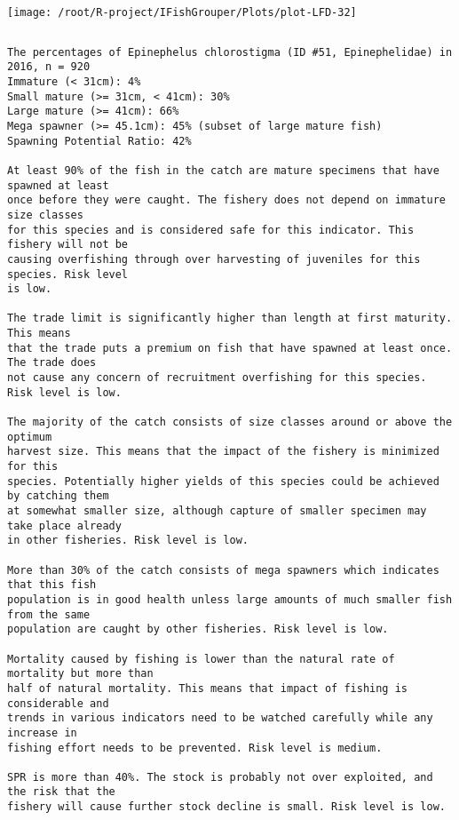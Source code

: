 \documentclass{report}\usepackage[]{graphicx}\usepackage[]{color}
\makeatletter
\def\maxwidth{ %
  \ifdim\Gin@nat@width>\linewidth
    \linewidth
  \else
    \Gin@nat@width
  \fi
}
\newenvironment{kframe}{%
 \def\at@end@of@kframe{}%
 \ifinner\ifhmode%
  \def\at@end@of@kframe{\end{minipage}}%
  \begin{minipage}{\columnwidth}%
 \fi\fi%
 \def\FrameCommand##1{\hskip\@totalleftmargin \hskip-\fboxsep
 \colorbox{shadecolor}{##1}\hskip-\fboxsep
     \hskip-\linewidth \hskip-\@totalleftmargin \hskip\columnwidth}%
 \MakeFramed {\advance\hsize-\width
   \@totalleftmargin\z@ \linewidth\hsize
   \@setminipage}}%
 {\par\unskip\endMakeFramed%
 \at@end@of@kframe}
\newenvironment{knitrout}{}{} %
\makeatother
\begin{document}
\begin{knitrout}
\texttt{[image: /root/R-project/IFishGrouper/Plots/plot-LFD-32]} 
\begin{kframe}\begin{verbatim}
\end{verbatim}
\end{kframe}
\clearpage
\newpage
\begin{kframe}\begin{verbatim}The percentages of Epinephelus chlorostigma (ID #51, Epinephelidae) in 2016, n = 920
Immature (< 31cm): 4%
Small mature (>= 31cm, < 41cm): 30%
Large mature (>= 41cm): 66%
Mega spawner (>= 45.1cm): 45% (subset of large mature fish)
Spawning Potential Ratio: 42%
 
At least 90% of the fish in the catch are mature specimens that have spawned at least
once before they were caught. The fishery does not depend on immature size classes
for this species and is considered safe for this indicator. This fishery will not be
causing overfishing through over harvesting of juveniles for this species. Risk level
is low.

The trade limit is significantly higher than length at first maturity.  This means
that the trade puts a premium on fish that have spawned at least once. The trade does
not cause any concern of recruitment overfishing for this species. Risk level is low.

The majority of the catch consists of size classes around or above the optimum
harvest size. This means that the impact of the fishery is minimized for this
species. Potentially higher yields of this species could be achieved by catching them
at somewhat smaller size, although capture of smaller specimen may take place already
in other fisheries. Risk level is low.

More than 30% of the catch consists of mega spawners which indicates that this fish
population is in good health unless large amounts of much smaller fish from the same
population are caught by other fisheries. Risk level is low.
 
Mortality caused by fishing is lower than the natural rate of mortality but more than
half of natural mortality. This means that impact of fishing is considerable and
trends in various indicators need to be watched carefully while any increase in
fishing effort needs to be prevented. Risk level is medium.
 
SPR is more than 40%. The stock is probably not over exploited, and the risk that the
fishery will cause further stock decline is small. Risk level is low.
 

\end{verbatim}
\end{kframe}
\end{knitrout}
\end{document}
